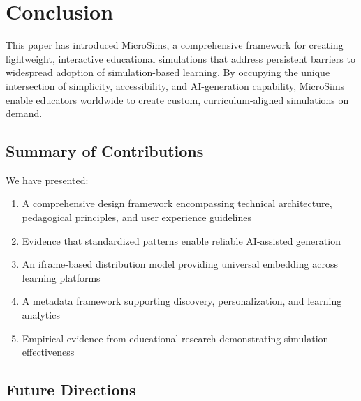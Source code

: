 \section{Conclusion}
\label{sec:conclusion}


This paper has introduced MicroSims, a comprehensive framework for creating lightweight, interactive educational simulations that address persistent barriers to widespread adoption of simulation-based learning. By occupying the unique intersection of simplicity, accessibility, and AI-generation capability, MicroSims enable educators worldwide to create custom, curriculum-aligned simulations on demand.

\subsection{Summary of Contributions}

We have presented:
\begin{enumerate}
\item A comprehensive design framework encompassing technical architecture, pedagogical principles, and user experience guidelines
\item Evidence that standardized patterns enable reliable AI-assisted generation
\item An iframe-based distribution model providing universal embedding across learning platforms
\item A metadata framework supporting discovery, personalization, and learning analytics
\item Empirical evidence from educational research demonstrating simulation effectiveness
\end{enumerate}

\subsection{Future Directions}

